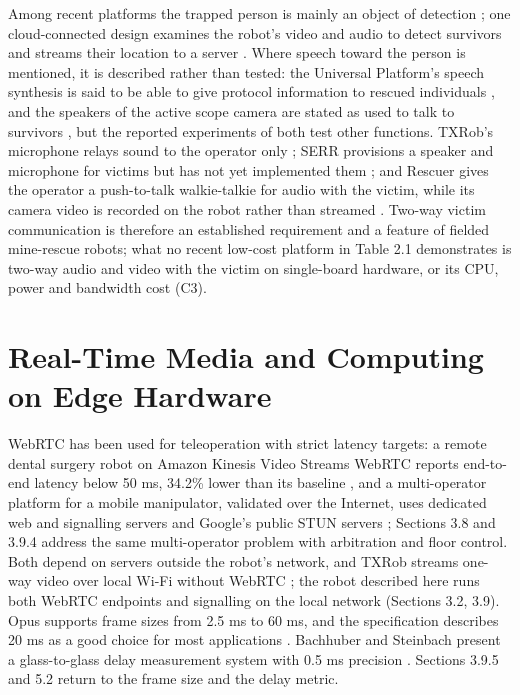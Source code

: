 Among recent platforms the trapped person is mainly an object of detection \cite{raghavan2026,khattab2025,kim2023,cantizani2022,deshmukh2025,sharma2022}; one cloud-connected design examines the robot's video and audio to detect survivors and streams their location to a server \cite{sharma2022}. Where speech toward the person is mentioned, it is described rather than tested: the Universal Platform's speech synthesis is said to be able to give protocol information to rescued individuals \cite{cafolla2026}, and the speakers of the active scope camera are stated as used to talk to survivors \cite{yamauchi2022}, but the reported experiments of both test other functions. TXRob's microphone relays sound to the operator only \cite{verano2022}; SERR provisions a speaker and microphone for victims but has not yet implemented them \cite{khattab2025}; and Rescuer gives the operator a push-to-talk walkie-talkie for audio with the victim, while its camera video is recorded on the robot rather than streamed \cite{manuel2022}. Two-way victim communication is therefore an established requirement and a feature of fielded mine-rescue robots; what no recent low-cost platform in Table 2.1 demonstrates is two-way audio and video with the victim on single-board hardware, or its CPU, power and bandwidth cost (C3).

\section{Real-Time Media and Computing on Edge Hardware}

WebRTC has been used for teleoperation with strict latency targets: a remote dental surgery robot on Amazon Kinesis Video Streams WebRTC reports end-to-end latency below 50 ms, 34.2\% lower than its baseline \cite{shi2025webrtc}, and a multi-operator platform for a mobile manipulator, validated over the Internet, uses dedicated web and signalling servers and Google's public STUN servers \cite{tiberkak2023}; Sections 3.8 and 3.9.4 address the same multi-operator problem with arbitration and floor control. Both depend on servers outside the robot's network, and TXRob streams one-way video over local Wi-Fi without WebRTC \cite{verano2022}; the robot described here runs both WebRTC endpoints and signalling on the local network (Sections 3.2, 3.9). Opus supports frame sizes from 2.5 ms to 60 ms, and the specification describes 20 ms as a good choice for most applications \cite{valin2012}. Bachhuber and Steinbach present a glass-to-glass delay measurement system with 0.5 ms precision \cite{bachhuber2016}. Sections 3.9.5 and 5.2 return to the frame size and the delay metric.

